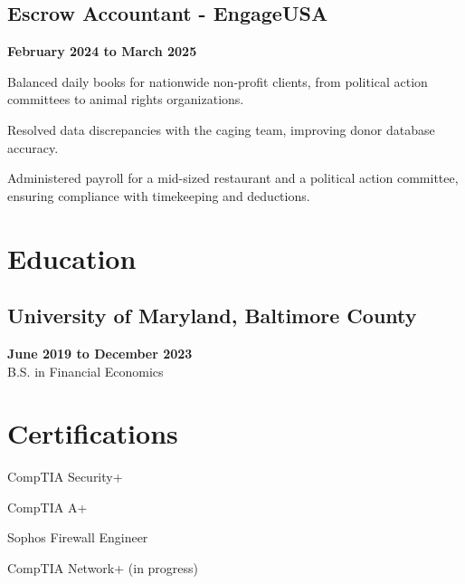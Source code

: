 \documentclass{article}
\begin{document}
\subsection{Escrow Accountant - EngageUSA}
\textbf{February 2024 to March 2025} \\
\begin{compactitem}
	\item Balanced daily books for nationwide non-profit clients, from political action committees to animal rights organizations.
	\item Resolved data discrepancies with the caging team, improving donor database accuracy.
	\item Administered payroll for a mid-sized restaurant and a political action committee, ensuring compliance with timekeeping and deductions.
\end{compactitem}

\section{Education}

\subsection{University of Maryland, Baltimore County}
\textbf{June 2019 to December 2023} \\
B.S. in Financial Economics

\section{Certifications}

\begin{compactitem}
	\item CompTIA Security+
	\item CompTIA A+
	\item Sophos Firewall Engineer
	\item CompTIA Network+ (in progress)
\end{compactitem}
\end{document}
